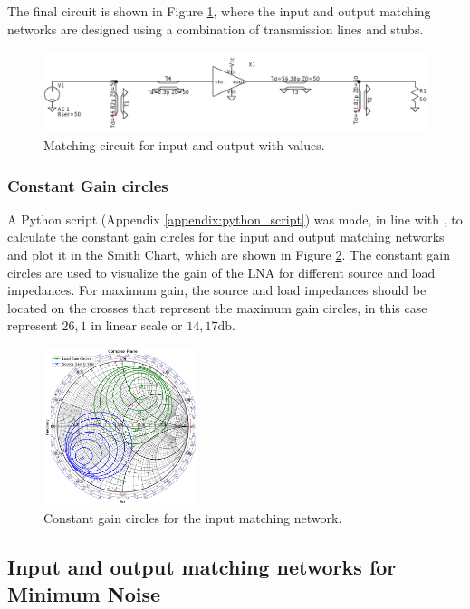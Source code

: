 The final circuit is shown in Figure \ref{fig:MatchingCircuit-line}, where the input and output matching networks are designed using a combination of transmission lines and stubs.

\begin{figure}[h]
    \centering
    \includegraphics[width=1\textwidth]{Images/LS_matching-circuit.png}
    \caption{Matching circuit for input and output with values.}
    \label{fig:MatchingCircuit-line}
\end{figure}

\subsubsection{Constant Gain circles}

A Python script (Appendix \ref{appendix:python_script}) was made, in line with \cite{Gillermo-Gonzalez}, to calculate the constant gain circles for the input and output matching networks and plot it in the Smith Chart, which are shown in Figure \ref{fig:ConstantGainCircles}. The constant gain circles are used to visualize the gain of the LNA for different source and load impedances. For maximum gain, the source and load impedances should be located on the crosses that represent the maximum gain circles, in this case represent $26,1$ in linear scale or $14,17 \si{\decibel}$.
\begin{figure}[H]
    \centering
    \includegraphics[width=0.4\textwidth]{Images/ConstantGainCircles.png}
    \caption{Constant gain circles for the input matching network.}
    \label{fig:ConstantGainCircles}
\end{figure}

\subsection{Input and output matching networks for Minimum Noise}

